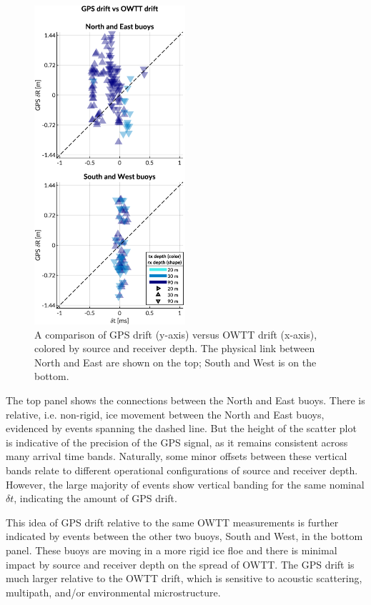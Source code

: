 \begin{figure}[h!]
	\centering
	\includegraphics[width=\reprintcolumnwidth]{figs/Fig8.pdf} 
	\caption{A comparison of GPS drift (y-axis) versus OWTT drift (x-axis), colored by source and receiver depth. The physical link between North and East are shown on the top; South and West is on the bottom.}
	\label{fig:gps-drift-example}
\end{figure}

The top panel shows the connections between the North and East buoys.
There is relative, i.e. non-rigid, ice movement between the North and East buoys, evidenced by events spanning the dashed line.
But the height of the scatter plot is indicative of the precision of the GPS signal, as it remains consistent across many arrival time bands.
Naturally, some minor offsets between these vertical bands relate to different operational configurations of source and receiver depth.
However, the large majority of events show vertical banding for the same nominal $\delta t$, indicating the amount of GPS drift.

This idea of GPS drift relative to the same OWTT measurements is further indicated by events between the other two buoys, South and West, in the bottom panel.
These buoys are moving in a more rigid ice floe and there is minimal impact by source and receiver depth on the spread of OWTT.
The GPS drift is much larger relative to the OWTT drift, which is sensitive to acoustic scattering, multipath, and/or environmental microstructure.

